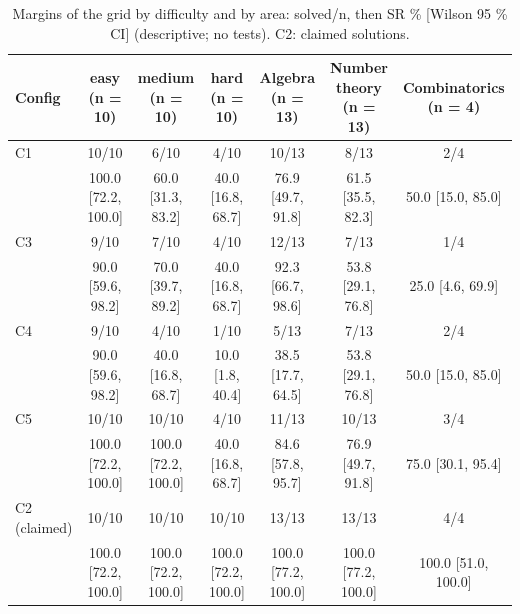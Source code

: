 \begin{table}[t]
\centering
\scriptsize
\setlength{\tabcolsep}{3pt}
\caption{Margins of the grid by difficulty and by area: solved/n, then SR \% {[}Wilson 95 \% CI{]} (descriptive; no tests). C2: claimed solutions.}
\label{tab:margins}
\begin{tabular}{lcccccc}
\toprule
Config & easy (n = 10) & medium (n = 10) & hard (n = 10) & Algebra (n = 13) & Number theory (n = 13) & Combinatorics (n = 4) \\
\midrule
C1 & 10/10 & 6/10 & 4/10 & 10/13 & 8/13 & 2/4 \\
 & 100.0 {[}72.2, 100.0{]} & 60.0 {[}31.3, 83.2{]} & 40.0 {[}16.8, 68.7{]} & 76.9 {[}49.7, 91.8{]} & 61.5 {[}35.5, 82.3{]} & 50.0 {[}15.0, 85.0{]} \\
C3 & 9/10 & 7/10 & 4/10 & 12/13 & 7/13 & 1/4 \\
 & 90.0 {[}59.6, 98.2{]} & 70.0 {[}39.7, 89.2{]} & 40.0 {[}16.8, 68.7{]} & 92.3 {[}66.7, 98.6{]} & 53.8 {[}29.1, 76.8{]} & 25.0 {[}4.6, 69.9{]} \\
C4 & 9/10 & 4/10 & 1/10 & 5/13 & 7/13 & 2/4 \\
 & 90.0 {[}59.6, 98.2{]} & 40.0 {[}16.8, 68.7{]} & 10.0 {[}1.8, 40.4{]} & 38.5 {[}17.7, 64.5{]} & 53.8 {[}29.1, 76.8{]} & 50.0 {[}15.0, 85.0{]} \\
C5 & 10/10 & 10/10 & 4/10 & 11/13 & 10/13 & 3/4 \\
 & 100.0 {[}72.2, 100.0{]} & 100.0 {[}72.2, 100.0{]} & 40.0 {[}16.8, 68.7{]} & 84.6 {[}57.8, 95.7{]} & 76.9 {[}49.7, 91.8{]} & 75.0 {[}30.1, 95.4{]} \\
C2 (claimed) & 10/10 & 10/10 & 10/10 & 13/13 & 13/13 & 4/4 \\
 & 100.0 {[}72.2, 100.0{]} & 100.0 {[}72.2, 100.0{]} & 100.0 {[}72.2, 100.0{]} & 100.0 {[}77.2, 100.0{]} & 100.0 {[}77.2, 100.0{]} & 100.0 {[}51.0, 100.0{]} \\
\bottomrule
\end{tabular}
\end{table}

